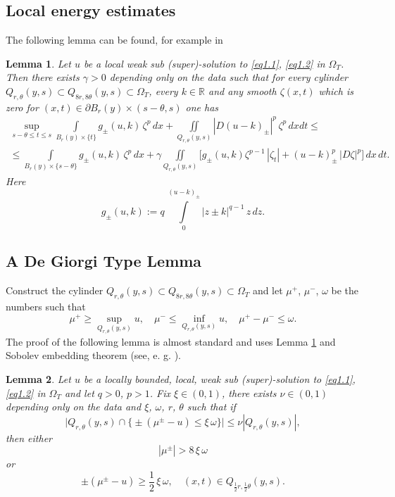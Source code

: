 \documentclass[a4paper,11pt,fullpage]{article}
\numberwithin{equation}{section}
\newtheorem{lemma}{Lemma}[section]
\begin{document}
\subsection{Local energy estimates}
The following lemma can be found, for example  in \cite{Bog1}

\begin{lemma}\label{lem2.3}
Let $u$ be a local weak sub (super)-solution to \eqref{eq1.1}, \eqref{eq1.2} in $\Omega_T$. Then there exists $\gamma>0$ depending only on the data such that for every cylinder $Q_{r, \theta}(y, s) \subset Q_{8r, 8\theta}(y, s)\subset \Omega_T$, every
$k\in \mathbb{R}$ and any smooth $\zeta(x, t)$ which is zero for $(x, t) \in \partial B_r(y)\times (s-\theta, s)$ one has
\begin{multline}\label{eq2.5}
\sup\limits_{s-\theta\leqslant t\leqslant s}\int\limits_{B_r(y)\times\{t\}}g_{\pm}(u, k)\,\zeta^p\,dx+
\iint\limits_{Q_{r,\theta}(y, s)}|D(u-k)_{\pm}|^p\,\zeta^p\,dx dt\leqslant\\\leqslant \int\limits_{B_r(y)\times\{s-\theta\}}g_{\pm}(u, k)\,\zeta^p\,dx+\gamma\iint\limits_{Q_{r, \theta}(y, s)}\Big[g_{\pm}(u, k)\zeta^{p-1}\,|\zeta_t|+(u-k)_{\pm}^p\,|D \zeta|^p\Big]\,dx\,dt.
\end{multline}
Here
$$g_{\pm}(u, k):=q\,\int\limits_0^{(u-k)_{\pm}}|z \pm k|^{q-1}\,z\,dz.$$
\end{lemma}

\subsection{A De Giorgi Type Lemma}
Construct the cylinder $Q_{r, \theta}(y, s) \subset Q_{8r, 8\theta}(y, s)\subset \Omega_T$ and let $\mu^+$, $\mu^-$, $\omega$ be the numbers such that
$$\mu^+\geqslant \sup\limits_{Q_{r, \theta}(y, s)} u,\quad \mu^-\leqslant \inf\limits_{Q_{r, \theta}(y, s)} u,\quad \mu^+-\mu^-\leqslant \omega.$$
 The proof of the following lemma is almost standard and uses Lemma \ref{lem2.3} and Sobolev embedding theorem (see, e. g. \cite[Lemma 6.1]{Lia1}).
 
\begin{lemma}\label{lem2.4}
Let $u$ be a locally bounded, local, weak sub (super)-solution to \eqref{eq1.1}, \eqref{eq1.2} in $\Omega_T$ and let $q>0$, $p>1$.
Fix $\xi\in (0, 1)$, there exists $\nu\in (0, 1)$ depending only on the data and $\xi$, $\omega$,  $r$, $\theta$ such that if
\begin{equation}\label{eq2.6}
\big|Q_{r, \theta}(y, s)\cap \big\{\pm(\mu^{\pm}-u)\leqslant \xi\,\omega\big\}\big|\leqslant \nu |Q_{r, \theta}(y, s)|,
\end{equation}
then either
\begin{equation}\label{eq2.7}
|\mu^{\pm}| >8\,\xi\,\omega
\end{equation}
or
\begin{equation}\label{eq2.8}
\pm(\mu^{\pm}-u)\geqslant \frac{1}{2}\,\xi\,\omega,\quad (x, t)\in Q_{\frac{1}{2}r, \frac{1}{2}\theta}(y, s).
\end{equation}
\end{lemma}
\end{document}
